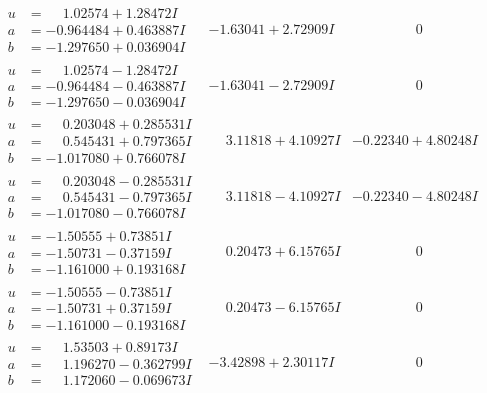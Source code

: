 \documentclass[1p]{elsarticle_modified}
\theoremstyle{definition}
\begin{document}
$$\begin{array}{c|c|c}
\begin{aligned}
u &= \phantom{-}1.02574 + 1.28472 I \\
a &= -0.964484 + 0.463887 I \\
b &= -1.297650 + 0.036904 I\end{aligned}
 & -1.63041 + 2.72909 I & \phantom{-0.000000 } 0 \\ \hline\begin{aligned}
u &= \phantom{-}1.02574 - 1.28472 I \\
a &= -0.964484 - 0.463887 I \\
b &= -1.297650 - 0.036904 I\end{aligned}
 & -1.63041 - 2.72909 I & \phantom{-0.000000 } 0 \\ \hline\begin{aligned}
u &= \phantom{-}0.203048 + 0.285531 I \\
a &= \phantom{-}0.545431 + 0.797365 I \\
b &= -1.017080 + 0.766078 I\end{aligned}
 & \phantom{-}3.11818 + 4.10927 I & -0.22340 + 4.80248 I \\ \hline\begin{aligned}
u &= \phantom{-}0.203048 - 0.285531 I \\
a &= \phantom{-}0.545431 - 0.797365 I \\
b &= -1.017080 - 0.766078 I\end{aligned}
 & \phantom{-}3.11818 - 4.10927 I & -0.22340 - 4.80248 I \\ \hline\begin{aligned}
u &= -1.50555 + 0.73851 I \\
a &= -1.50731 - 0.37159 I \\
b &= -1.161000 + 0.193168 I\end{aligned}
 & \phantom{-}0.20473 + 6.15765 I & \phantom{-0.000000 } 0 \\ \hline\begin{aligned}
u &= -1.50555 - 0.73851 I \\
a &= -1.50731 + 0.37159 I \\
b &= -1.161000 - 0.193168 I\end{aligned}
 & \phantom{-}0.20473 - 6.15765 I & \phantom{-0.000000 } 0 \\ \hline\begin{aligned}
u &= \phantom{-}1.53503 + 0.89173 I \\
a &= \phantom{-}1.196270 - 0.362799 I \\
b &= \phantom{-}1.172060 - 0.069673 I\end{aligned}
 & -3.42898 + 2.30117 I & \phantom{-0.000000 } 0 \\ \hline\begin{aligned}

\end{aligned}
\end{array}$$
\end{document}
